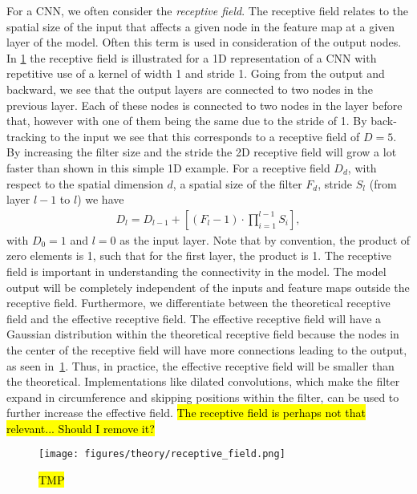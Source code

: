 For a \acrshort{CNN}, we often consider the \textit{receptive field}. The
receptive field relates to the spatial size of the input that affects a given
node in the feature map at a given layer of the model. Often this term is used in consideration of the output nodes. In \cref{fig:receptive_field} the receptive field is illustrated for a 1D
representation of a \acrshort{CNN} with repetitive use of a kernel of width 1 and  stride 1. Going from the output and backward, we see that the output layers are connected to two nodes in the previous layer. Each of these nodes is connected to two nodes in the layer before that, however with one of them being the same due to the stride of 1. By back-tracking to the input we see that this
corresponds to a receptive field of $D = 5$. By increasing the filter size and
the stride the 2D receptive field will grow a lot faster than shown in this
simple 1D example. For a receptive field $D_d$, with respect to the spatial dimension $d$, a
spatial size of the filter $F_d$, stride $S_l$ (from layer $l-1$ to $l$) we have
\begin{align*}
    D_l = D_{l-1} + \left[(F_l - 1) \cdot \prod_{i=1}^{l-1}S_i \right],
\end{align*}
with $D_0 = 1$ and $l=0$ as the input layer. Note that by convention, the
product of zero elements is 1, such that for the first layer, the product is 1. The receptive field is important in understanding the connectivity in the model. The model output will be completely independent of the inputs and feature maps outside the receptive field. Furthermore, we differentiate between the theoretical
receptive field and the effective receptive field. The effective receptive field
will have a Gaussian distribution within the theoretical receptive field because the nodes in the center of the receptive field will have more connections leading to the output, as seen in~\cref{fig:receptive_field}. Thus, in practice, the effective receptive field will be smaller than the theoretical. Implementations like dilated convolutions, which make the filter expand in circumference and skipping positions within the filter, can be used to further increase the effective field. \hl{The receptive field is perhaps not that relevant... Should I remove it?}

\begin{figure}[H]
  \centering
  \texttt{[image: figures/theory/receptive\_field.png]}
  \caption{\hl{TMP}}
  \label{fig:receptive_field}
\end{figure}


